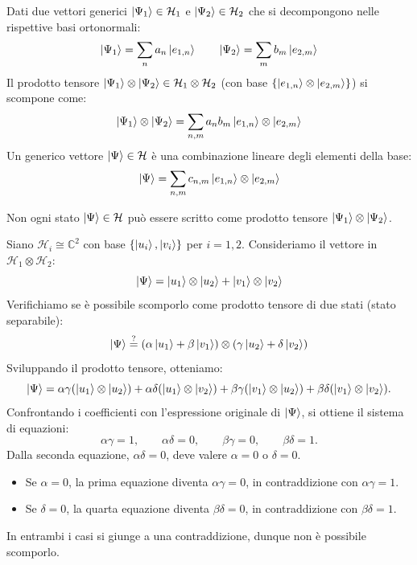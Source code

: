 Dati due vettori generici \(\ket{\Psi_1} \in \mathcal{H}_1\) e \(\ket{\Psi_2} \in \mathcal{H}_2\) che si decompongono nelle rispettive basi ortonormali:
\[
    \ket{\Psi_1} = \sum_{n} a_n \ket{e_{1,n}} \qquad \ket{\Psi_2} = \sum_{m} b_m \ket{e_{2,m}}
\]
Il prodotto tensore \(\ket{\Psi_1} \otimes \ket{\Psi_2} \in \mathcal{H}_1 \otimes \mathcal{H}_2\) (con base \(\{\ket{e_{1,n}} \otimes \ket{e_{2,m}}\}\)) si scompone come:
\[
    \ket{\Psi_1} \otimes \ket{\Psi_2} = \sum_{n,m} a_n b_m \ket{e_{1,n}} \otimes \ket{e_{2,m}}
\]
Un generico vettore \(\ket{\Psi} \in \mathcal{H}\) è una combinazione lineare degli elementi della base:
\[
    \ket{\Psi} = \sum_{n,m} c_{n,m} \ket{e_{1,n}} \otimes \ket{e_{2,m}}
\]
\begin{attention}
    Non ogni stato \(\ket{\Psi} \in \mathcal{H}\) può essere scritto come prodotto tensore \(\ket{\Psi_1} \otimes \ket{\Psi_2}\).
\end{attention}

\begin{example}
    Siano \(\mathcal{H}_i \cong \mathbb{C}^2\) con base \(\{\ket{u_i}, \ket{v_i}\}\) per \(i=1,2\).
    Consideriamo il vettore in \(\mathcal{H}_1 \otimes \mathcal{H}_2\):
    \[
        \ket{\Psi} = \ket{u_1}\otimes\ket{u_2} + \ket{v_1}\otimes\ket{v_2}
    \]
    Verifichiamo se è possibile scomporlo come prodotto tensore di due stati (stato separabile):
    \[
        \ket{\Psi} \overset{?}{=} (\alpha\ket{u_1} + \beta\ket{v_1}) \otimes (\gamma\ket{u_2} + \delta\ket{v_2})
    \]
    Sviluppando il prodotto tensore, otteniamo:
    \[
        \ket{\Psi} = \alpha\gamma (\ket{u_1}\otimes\ket{u_2}) + \alpha\delta (\ket{u_1}\otimes\ket{v_2}) + \beta\gamma (\ket{v_1}\otimes\ket{u_2}) + \beta\delta (\ket{v_1}\otimes\ket{v_2}).
    \]
    Confrontando i coefficienti con l'espressione originale di \(\ket{\Psi}\), si ottiene il sistema di equazioni:
    \[
        \alpha\gamma = 1, \qquad \alpha\delta = 0, \qquad \beta\gamma = 0, \qquad \beta\delta = 1.
    \]
    Dalla seconda equazione, \(\alpha\delta = 0\), deve valere \(\alpha=0\) o \(\delta=0\).
    \begin{itemize}
        \item Se \(\alpha=0\), la prima equazione diventa \(\alpha\gamma = 0\), in contraddizione con \(\alpha\gamma = 1\).
        \item Se \(\delta=0\), la quarta equazione diventa \(\beta\delta = 0\), in contraddizione con \(\beta\delta = 1\).
    \end{itemize}
    In entrambi i casi si giunge a una contraddizione, dunque non è possibile scomporlo. 
\end{example}


